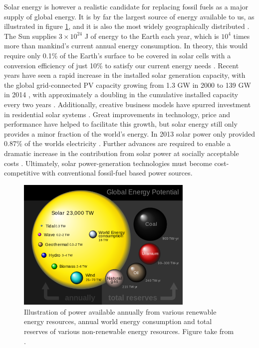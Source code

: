 Solar energy is however a realistic candidate for replacing fossil fuels as a major supply of global energy. It is by far the largest source of energy available to us, as illustrated in figure \ref{global_energy}, and it is also the most widely geographically distributed \cite{inorg_pv}. The Sun supplies $3 \times 10^{24}$ J of energy to the Earth each year, which is $10^4$ times more than mankind's current annual energy consumption. In theory, this would require only 0.1\% of the Earth's surface to be covered in solar cells with a conversion efficiency of just 10\% to satisfy our current energy needs \cite{Gratzel}. Recent years have seen a rapid increase in the installed solar generation capacity, with the global grid-connected PV capacity growing from 1.3 GW in 2000 to 139 GW in 2014 \cite{pathways_129}, with approximately a doubling in the cumulative installed capacity every two years \cite{pathways}. Additionally, creative business models have spurred investment in residential solar systems \cite{MIT}. Great improvements in technology, price and performance have helped to facilitate this growth, but solar energy still only provides a minor fraction of the world's energy. In 2013 solar power only provided 0.87\% of the worlds electricity \cite{pathways_130}. Further advances are required to enable a dramatic increase in the contribution from solar power at socially acceptable costs \cite{MIT}. Ultimately, solar power-generation technologies must become cost-competitive with conventional fossil-fuel based power sources.\\

\begin{figure}[h!]
  \centering
    \includegraphics[width=0.75\textwidth]{figures/global_energy.png}
    \caption{Illustration of power available annually from various renewable energy resources, annual world energy consumption and total reserves of various non-renewable energy resources. Figure take from .}
  \label{global_energy}
\end{figure}

